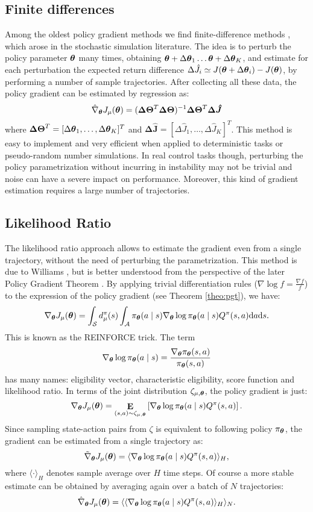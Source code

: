 \subsection{Finite differences}
Among the oldest policy gradient methods we find finite-difference methods \cite{Glynn:1990:LRG:84537.84552}, which arose in the stochastic simulation literature. The idea is to perturb the policy parameter $\boldsymbol{\theta}$ many times, obtaining $\boldsymbol{\theta}+\Delta\boldsymbol{\theta}_1 \dots \boldsymbol{\theta}+\Delta\boldsymbol{\theta}_K$, and estimate for each perturbation the expected return difference $\Delta\hat{J}_i \simeq J(\boldsymbol{\theta}+\Delta\boldsymbol{\theta}_i) - J(\boldsymbol{\theta})$, by performing a number of sample trajectories. After collecting all these data, the policy gradient can be estimated by regression as:
\[
	\hat{\nabla}_{\boldsymbol{\theta}}J_{\mu}(\boldsymbol{\theta}) = (\boldsymbol{\Delta\Theta}^T\boldsymbol{\Delta\Theta})^{-1}\boldsymbol{\Delta\Theta}^T\boldsymbol{\Delta\hat{J}}
\]
where $\boldsymbol{\Delta\Theta}^T = [\Delta\boldsymbol{\theta}_1,\dots,\Delta\boldsymbol{\theta}_K]^T$ and $\boldsymbol{\Delta\hat{J}} = [\Delta\hat{J}_1,\dots,\Delta\hat{J}_K]^T$. This method is easy to implement and very efficient when applied to deterministic tasks or pseudo-random number simulations. In real control tasks though, perturbing the policy parametrization without incurring in instability may not be trivial and noise can have a severe impact on performance. Moreover, this kind of gradient estimation requires a large number of trajectories.

\subsection{Likelihood Ratio}\label{sec:likelihood_ratio}
The likelihood ratio approach allows to estimate the gradient even from a single trajectory, without the need of perturbing the parametrization. This method is due to Williams \cite{Williams1992}, but is better understood from the perspective of the later Policy Gradient Theorem \cite{Sutton1999a}.
By applying trivial differentiation rules ($\nabla\log f = \frac{\nabla f}{f}$) to the expression of the policy gradient (see Theorem \ref{theo:pgt}), we have:
\[
	\nabla_{\boldsymbol{\theta}}J_\mu(\boldsymbol{\theta}) = \int_{\mathcal{S}}d_{\mu}^{\pi}(s)
		\int_{\mathcal{A}}\pi_{\boldsymbol{\theta}}(a \mid s)\nabla_{\boldsymbol{\theta}}\log\pi_{\boldsymbol{\theta}}(a \mid s)
		Q^{\pi}(s,a)\mathrm{d}a\mathrm{d}s.
\]
This is known as the REINFORCE \cite{Williams1992} trick. The term
\[
	\nabla_{\boldsymbol{\theta}}\log\pi_{\boldsymbol{\theta}}(a \mid s) = \frac{\nabla_{\boldsymbol{\theta}}\pi_{\boldsymbol{\theta}}(s,a)}{\pi_{\boldsymbol{\theta}}(s,a)}
\]
has many names: eligibility vector, characteristic eligibility, score function and likelihood ratio.
In terms of the joint distribution $\zeta_{\mu,\boldsymbol{\theta}}$, the policy gradient is just:
\[
	\nabla_{\boldsymbol{\theta}}J_\mu(\boldsymbol{\theta}) = \mathop{\mathbf{E}}_{(s,a)\sim\zeta_{\mu,\boldsymbol{\theta}}}\left[\nabla_{\boldsymbol{\theta}}\log\pi_{\boldsymbol{\theta}}(a \mid s) Q^{\pi}(s,a)\right].
\]
Since sampling state-action pairs from $\zeta$ is equivalent to following policy $\pi_{\boldsymbol{\theta}}$, the gradient can be estimated from a single trajectory as:
\[
	\tilde{\nabla}_{\boldsymbol{\theta}}J_{\mu}(\boldsymbol{\theta}) = \langle\nabla_{\boldsymbol{\theta}}\log\pi_{\boldsymbol{\theta}}(a \mid s) Q^{\pi}(s,a)\rangle_H,
\]
where $\langle\cdot\rangle_H$ denotes sample average over $H$ time steps. Of course a more stable estimate can be obtained by averaging again over a batch of $N$ trajectories:
\[
	\hat{\nabla}_{\boldsymbol{\theta}}J_{\mu}(\boldsymbol{\theta}) = \langle\langle\nabla_{\boldsymbol{\theta}}\log\pi_{\boldsymbol{\theta}}(a \mid s) Q^{\pi}(s,a)\rangle_H\rangle_N.
\]

